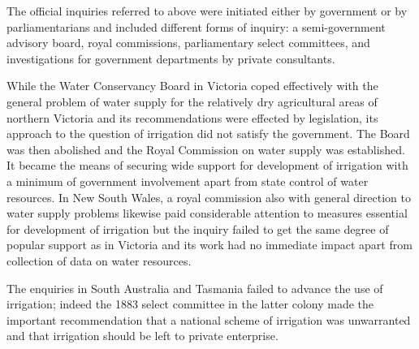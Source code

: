 \closure
The official inquiries referred to above were initiated either by
government or by parliamentarians and included different forms of
inquiry: a semi-govern\-ment advisory board, royal commissions,
parliamentary select committees, and investigations for government
departments by private consultants.

While the Water Conservancy Board in Victoria coped effectively with
the general problem of water supply for the relatively dry
agricultural areas of northern Victoria and its recommendations were
effected by legislation, its approach to the question of irrigation
did not satisfy the government.  The Board was then abolished and the
Royal Commission on water supply was established.  It became the
means of securing wide support for development of irrigation with a
minimum of government involvement apart from state control of water
resources.  In New South Wales, a royal commission also with general
direction to water supply problems likewise paid considerable
attention to measures essential for development of irrigation but the
inquiry failed to get the same degree of popular support as in
Victoria and its work had no immediate impact apart from collection of
data on water resources.

The enquiries in South Australia and Tasmania failed to advance the
use of irrigation; indeed the 1883 select committee in the latter
colony made the important recommendation that a national scheme of
irrigation was unwarranted and that irrigation should be left to
private enterprise.

